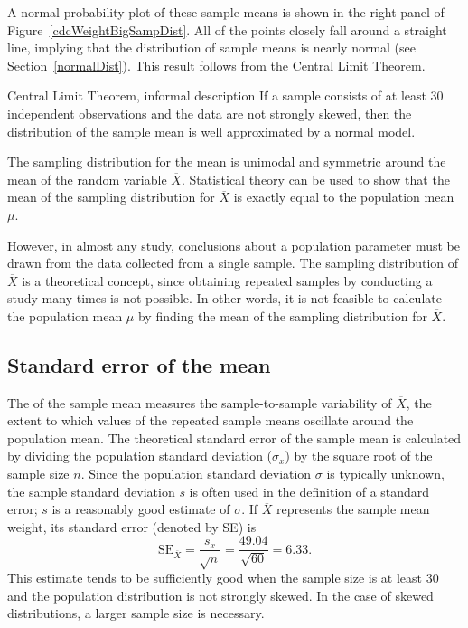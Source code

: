 A normal probability plot of these sample means is shown in the right panel of Figure~\ref{cdcWeightBigSampDist}. All of the points closely fall around a straight line, implying that the distribution of sample means is nearly normal (see Section~\ref{normalDist}). This result follows from the Central Limit Theorem.
 
\begin{onebox}{Central Limit Theorem, informal description}
If a sample consists of at least 30 independent observations and the data are not strongly skewed, then the distribution of the sample mean is well approximated by a normal model.
\end{onebox}

\textD{\newpage}

The sampling distribution for the mean is unimodal and symmetric around the mean of the random variable $\overline{X}$. Statistical theory can be used to show that the mean of the sampling distribution for $\overline{X}$ is exactly equal to the population mean $\mu$. 

However, in almost any study, conclusions about a population parameter must be drawn from the data collected from a single sample. The sampling distribution of $\overline{X}$ is a theoretical concept, since obtaining repeated samples by conducting a study many times is not possible. In other words, it is not feasible to calculate the population mean $\mu$ by finding the mean of the sampling distribution for $\overline{X}$.

\subsection{Standard error of the mean}
\label{seOfTheMean}

The  of the sample mean measures the sample-to-sample variability of $\overline{X}$, the extent to which values of the repeated sample means oscillate around the population mean. The theoretical standard error of the sample mean is calculated by dividing the population standard deviation ($\sigma_{x}$) by the square root of the sample size $n$. Since the population standard deviation $\sigma$ is typically unknown, the sample standard deviation $s$ is often used in the definition of a standard error; $s$ is a reasonably good estimate of $\sigma$. If $\overline{X}$ represents the sample mean weight, its standard error (denoted by SE) is
\[\text{SE}_{\overline{X}} = \dfrac{s_{x}}{\sqrt{n}} = \dfrac{49.04}{\sqrt{60}} = 6.33. \]
This estimate tends to be sufficiently good when the sample size is at least 30 and the population distribution is not strongly skewed. In the case of skewed distributions, a larger sample size is necessary.

